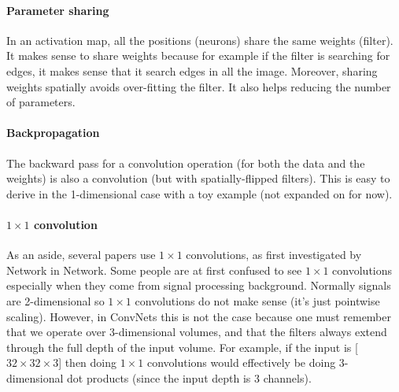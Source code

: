 \paragraph*{Parameter sharing} In an activation map, all the positions (neurons) share the same weights (filter). It makes sense to share weights because for example if the filter is searching for edges, it makes sense that it search edges in all the image. Moreover, sharing weights spatially avoids over-fitting the filter. It also helps reducing the number of parameters.

\paragraph*{Backpropagation} The backward pass for a convolution operation (for both the data and the weights) is also a convolution (but with spatially-flipped filters). This is easy to derive in the 1-dimensional case with a toy example (not expanded on for now).

\paragraph*{$1 \times 1$ convolution} As an aside, several papers use $1 \times 1$ convolutions, as first investigated by Network in Network. Some people are at first confused to see $1 \times 1$ convolutions especially when they come from signal processing background. Normally signals are 2-dimensional so $1 \times 1$ convolutions do not make sense (it’s just pointwise scaling). However, in ConvNets this is not the case because one must remember that we operate over 3-dimensional volumes, and that the filters always extend through the full depth of the input volume. For example, if the input is [$32 \times 32 \times 3$] then doing $1 \times 1$ convolutions would effectively be doing 3-dimensional dot products (since the input depth is 3 channels).

